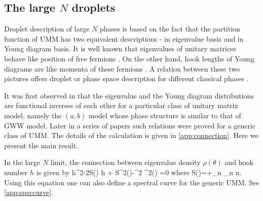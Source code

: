 \documentclass[final,3p,12pt,times]{elsarticle}
\numberwithin{equation}{section}
\begin{document}
\subsection{The large $N$ droplets}
\label{sec:connection}

Droplet description of large $N$ phases is based on the fact that the partition function of UMM has two equivalent descriptions - in eigenvalue basis and in Young diagram basis. It is well known that eigenvalues of unitary matrices behave like position of free fermions \cite{BIPZ}. On the other hand, hook lengths of Young diagrams are like momenta of these fermions \cite{duttagopakumar,douglas2}. A relation between these two pictures offers droplet or phase space description for different classical phases \cite{duttagopakumar,duttadutta,Chattopadhyay}.


It was first observed in \cite{duttagopakumar} that the eigenvalue and the Young diagram distributions are functional inverses of each other for a particular class of unitary matrix model, namely the $(a,b)$ model whose phase structure is similar to that of GWW model. Later in a series of papers \cite{duttadutta,riemannzero,Chattopadhyay} such relations were proved for a generic class of UMM. The details of the calculation is given in \ref{app:connection}. Here we present the main result.

In the large $N$ limit, the connection between eigenvalue density $\rho(\theta)$ and hook number $h$ is given by
%
\ben\label{eq:hrhorel}
h^2-2S(\theta) h + S^2(\theta)-\pi^2 \rho^2(\theta) =0
\een
%
where 
%
\ben\label{eq:Stheta}
S(\theta)=+\sum_n \beta_n \cos n\theta.
\een
%
Using this equation one can also define a spectral curve for the generic UMM. See \ref{app:speccurve}.
\end{document}
